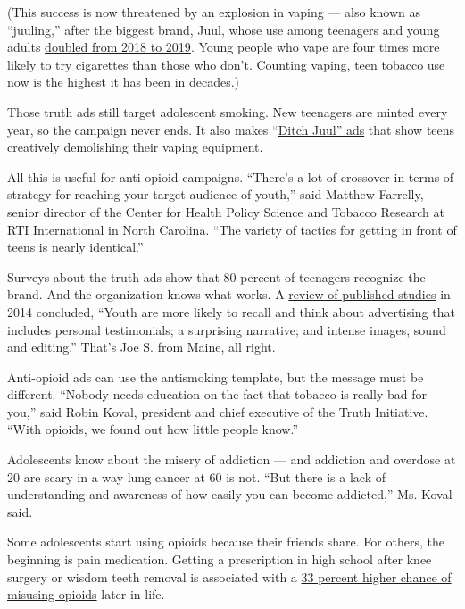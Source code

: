 (This success is now threatened by an explosion in vaping --- also known
as ``juuling,'' after the biggest brand, Juul, whose use among teenagers
and young adults
\href{https://truthinitiative.org/press/press-release/new-truth-initiative-study-finds-juul-use-doubled-one-year-tobacco-and-nicotine}{doubled
from 2018 to 2019}. Young people who vape are four times more likely to
try cigarettes than those who don't. Counting vaping, teen tobacco use
now is the highest it has been in decades.)

Those truth ads still target adolescent smoking. New teenagers are
minted every year, so the campaign never ends. It also makes
``\href{https://www.thetruth.com/articles/videos/ditch-juul}{Ditch
Juul'' ads} that show teens creatively demolishing their vaping
equipment.

All this is useful for anti-opioid campaigns. ``There's a lot of
crossover in terms of strategy for reaching your target audience of
youth,'' said Matthew Farrelly, senior director of the Center for Health
Policy Science and Tobacco Research at RTI International in North
Carolina. ``The variety of tactics for getting in front of teens is
nearly identical.''

Surveys about the truth ads show that 80 percent of teenagers recognize
the brand. And the organization knows what works. A
\href{https://www.ncbi.nlm.nih.gov/pubmed/25372236}{review of published
studies} in 2014 concluded, ``Youth are more likely to recall and think
about advertising that includes personal testimonials; a surprising
narrative; and intense images, sound and editing.'' That's Joe S. from
Maine, all right.

Anti-opioid ads can use the antismoking template, but the message must
be different. ``Nobody needs education on the fact that tobacco is
really bad for you,'' said Robin Koval, president and chief executive of
the Truth Initiative. ``With opioids, we found out how little people
know.''

Adolescents know about the misery of addiction --- and addiction and
overdose at 20 are scary in a way lung cancer at 60 is not. ``But there
is a lack of understanding and awareness of how easily you can become
addicted,'' Ms. Koval said.

Some adolescents start using opioids because their friends share. For
others, the beginning is pain medication. Getting a prescription in high
school after knee surgery or wisdom teeth removal is associated with a
\href{https://pediatrics.aappublications.org/content/136/5/e1169}{33
percent higher chance of misusing opioids} later in life.

